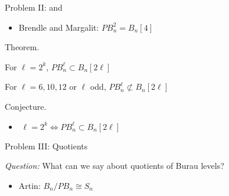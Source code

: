 \documentclass[final]{beamer}
\newlength{\colwidth}
\begin{document}
\begin{frame}[t]
\begin{columns}[t]
\begin{column}{\colwidth}
\begin{block}{
  \begin{huge}
    Problem II:  and 
  \end{huge}}
\vspace*{-10mm} 
\begin{huge} \begin{itemize}
\item[]Brendle and Margalit: $PB_n^2 = B_n[4]$
\end{itemize} 

\vspace*{-7mm}
{ \bf{\begin{huge} Theorem. \end{huge}}}

\vspace*{-7mm}
\begin{itemize} \begin{huge}
  \item[] For $\ell = 2^k$, $PB_n^\ell \subset B_n[2\ell]$
  
\item[] For $\ell = 6,10,12$ or $\ell$ odd, $PB_n^\ell \not\subset B_n[2\ell]$
\end{huge}
\end{itemize}
\vspace*{-7mm}

{\bf{\begin{huge} Conjecture. \end{huge}}}
\vspace*{-7mm}
\begin{huge}
\begin{itemize}
  
\item[] $\; \ell = 2^k \iff PB_n^\ell \subset B_n[2\ell]$

\end{itemize}
\end{huge}

\end{huge}

\end{block}

  \begin{block}{
  \begin{huge}
  \vspace*{5mm} 
    Problem III:   Quotients
  \end{huge}} 
 
\begin{huge} \vspace*{5mm}  \emph{Question:} What can we say about quotients of Burau levels? \end{huge}

\vspace*{-7mm}
\begin{huge}
  \begin{itemize}
  \item[] Artin: $B_n / PB_n \cong S_n$
  

\end{itemize}
\end{huge}
\end{block}
\end{column}
\end{columns}
\end{frame}
\end{document}
